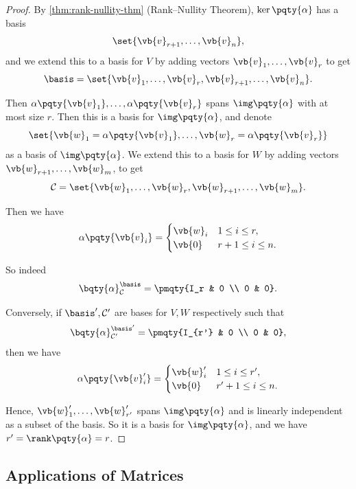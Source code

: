 \begin{proof}
    By \autoref{thm:rank-nullity-thm} (Rank--Nullity Theorem), \(\ker\pqty{\alpha}\) has a basis
    \[
        \set{\vb{v}_{r + 1}, \ldots, \vb{v}_n},
    \]
    and we extend this to a basis for \(V\) by adding vectors \(\vb{v}_1, \ldots, \vb{v}_r\) to get
    \[
        \basis = \set{\vb{v}_1, \ldots, \vb{v}_r, \vb{v}_{r + 1}, \ldots, \vb{v}_n}.
    \]
    
    Then \(\alpha\pqty{\vb{v}_1}, \ldots, \alpha\pqty{\vb{v}_r}\) spans \(\img\pqty{\alpha}\) with at most size \(r\). Then this is a basis for \(\img\pqty{\alpha}\), and denote
    \[
        \set{\vb{w}_1 = \alpha\pqty{\vb{v}_1}, \ldots, \vb{w}_r = \alpha\pqty{\vb{v}_r}}
    \]
    as a basis of \(\img\pqty{\alpha}\). We extend this to a basis for \(W\) by adding vectors \(\vb{w}_{r + 1}, \ldots, \vb{w}_m\), to get
    \[
        \mathcal{C} = \set{\vb{w}_1, \ldots, \vb{w}_r, \vb{w}_{r + 1}, \ldots, \vb{w}_m}.
    \]
    
    Then we have
    \[
        \alpha\pqty{\vb{v}_i} = \begin{cases}
            \vb{w}_i & 1 \leq i \leq r, \\
            \vb{0} & r + 1 \leq i \leq n.
        \end{cases}
    \]

    So indeed
    \[
        \bqty{\alpha}_{\mathcal{C}}^{\basis} = \pmqty{I_r & 0 \\ 0 & 0}.
    \]

    Conversely, if \(\basis', \mathcal{C}'\) are bases for \(V, W\) respectively such that
    \[
        \bqty{\alpha}_{\mathcal{C}'}^{\basis'} = \pmqty{I_{r'} & 0 \\ 0 & 0},
    \]
    then we have
    \[
        \alpha\pqty{\vb{v}_i'} = \begin{cases}
            \vb{w}_i' & 1 \leq i \leq r', \\
            \vb{0} & r' + 1 \leq i \leq n.
        \end{cases}
    \]

    Hence, \(\vb{w}_1', \ldots, \vb{w}_{r'}'\) spans \(\img \pqty{\alpha}\) and is linearly independent as a subset of the basis. So it is a basis for \(\img\pqty{\alpha}\), and we have \(r' = \rank\pqty{\alpha} = r\).
\end{proof}

\subsection{Applications of Matrices}

